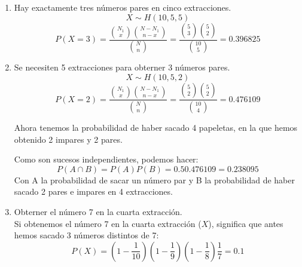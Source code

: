 \begin{sol}
\begin{enumerate}
\item Hay exactamente tres números pares en cinco extracciones.
\[
X \sim H(10,5,5)
\]
\[
P(X=3)=\frac{\binom{N_1}{x}\binom{N-N_1}{n-x}}{\binom{N}{n}}=\frac{\binom{5}{3}\binom{5}{2}}{\binom{10}{5}}=0.396825
\]
\item Se necesiten 5 extracciones para obterner 3 números pares.
\[
X \sim H(10, 5, 2)
\]
\[
P(X=2)=\frac{\binom{N_1}{x}\binom{N-N_1}{n-x}}{\binom{N}{n}}=\frac{\binom{5}{2}\binom{5}{2}}{\binom{10}{4}}=0.476109
\]

Ahora tenemos la probabilidad de haber sacado 4 papeletas, en la que hemos obtenido 2 impares y 2 pares. 

Como son sucesos independientes, podemos hacer:
\[
P(A\cap B)=P(A)P(B)=0.50.476109=0.238095
\]
Con A la probabilidad de sacar un número par y B la probabilidad de haber sacado 2 pares e impares en 4 extracciones.

\item Obterner el número 7 en la cuarta extracción. \\

Si obtenemos el número 7 en la cuarta extracción ($X$), significa que antes hemos sacado 3 números distintos de 7: 
\[
P(X)=(1-\frac{1}{10})(1-\frac{1}{9})(1-\frac{1}{8})\frac{1}{7} = 0.1
\]
\end{enumerate}

\end{sol}

